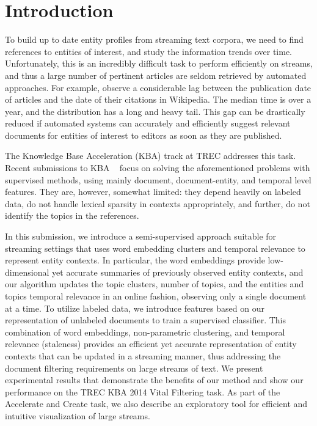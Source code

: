 \documentclass{article}
\begin{document}
\section{Introduction}
\label{intro}

To build up to date entity profiles from streaming text corpora, we need to find references to entities of interest, and study the information trends over time. 
Unfortunately, this is an incredibly difficult task to perform efficiently on streams, and thus a large number of pertinent articles are seldom retrieved by automated approaches.
For example, \citet{frank12} observe a considerable lag between the publication date of articles and the date of their citations in Wikipedia.
The median time is over a year, and the distribution has a long and heavy tail. 
This gap can be drastically reduced if automated systems can accurately and efficiently suggest relevant documents for entities of interest to editors as soon as they are published.

The Knowledge Base Acceleration (KBA) track at TREC addresses this task.
Recent submissions to KBA ~\cite{xitong13, bouvier13, efron13, zhang13, bellogin13} focus on solving the aforementioned problems with supervised methods, using mainly document, document-entity, and temporal level features.
They are, however, somewhat limited: they depend heavily on labeled data, do not handle lexical sparsity in contexts appropriately, and further, do not identify the topics in the references. %


In this submission, we introduce a semi-supervised approach suitable for streaming settings that uses word embedding clusters and temporal relevance to represent entity contexts. %
In particular, the word embeddings provide low-dimensional yet accurate summaries of previously observed entity contexts, and our algorithm updates the topic clusters, number of topics, and the entities and topics temporal relevance in an online fashion, observing only a single document at a time.
To utilize labeled data, we introduce features based on our representation of unlabeled documents to train a supervised classifier.
%
This combination of word embeddings, non-parametric clustering, and temporal relevance (staleness) provides an efficient yet accurate representation of entity contexts that can be updated in a streaming manner, thus addressing the document filtering requirements on large streams of text.
We present experimental results that demonstrate the benefits of our method and show our performance on the TREC KBA 2014 Vital Filtering task.
As part of the Accelerate and Create task, we also describe an exploratory tool for efficient and intuitive visualization of large streams.
\end{document}
